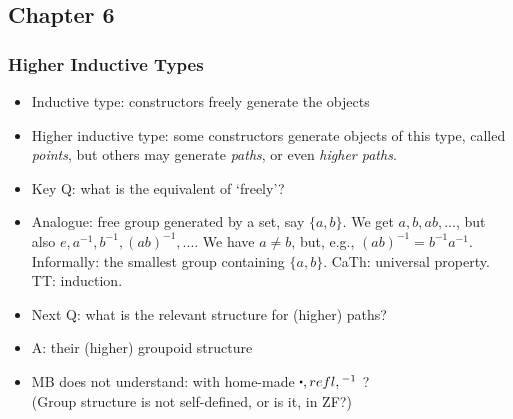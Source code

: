 \documentclass[handout]{beamer}
\newcommand{\set}[1]{\{#1\}}
\newcommand{\ct}{%
  \mathchoice{\mathbin{\raisebox{0.5ex}{$\displaystyle\centerdot$}}}%
             {\mathbin{\raisebox{0.5ex}{$\centerdot$}}}%
             {\mathbin{\raisebox{0.25ex}{$\scriptstyle\,\centerdot\,$}}}%
             {\mathbin{\raisebox{0.1ex}{$\scriptscriptstyle\,\centerdot\,$}}}
}
\begin{document}
    \subsection{Chapter 6}

\newcommand{\Sn}{\mathbb{S}}
\newcommand{\base}{\mathsf{base}}
\newcommand{\lloop}{\mathsf{loop}}
\newcommand{\surf}{\mathsf{surf}}

\frame
  {
    \frametitle{Higher Inductive Types}

    \begin{itemize}[<+->]
    \item Inductive type: constructors freely generate the objects
    \item Higher inductive type: some constructors generate objects of this type, 
             called \emph{points}, but others may generate \emph{paths},
             or even \emph{higher paths}.
    \item Key Q: what is the equivalent of `freely'? 
    \item Analogue: free group generated by a set, say $\set{a,b}$. 
    We get $a,b,ab,...$, but also $e,a^{-1},b^{-1},(ab)^{-1},...$. 
    We have $a\neq b$, but, e.g., $(ab)^{-1}=b^{-1}a^{-1}$. Informally:
   the smallest group containing $\set{a,b}$. CaTh: universal property.
   TT: induction.
    \item Next Q: what is the relevant structure for (higher) paths?
    \item A: their (higher) groupoid structure
    \item MB does not understand: with home-made $\ct,refl,{}^{-1}$ ?\\ 
    (Group structure is not self-defined, or is it, in ZF?)
    \end{itemize}
  }
\end{document}
